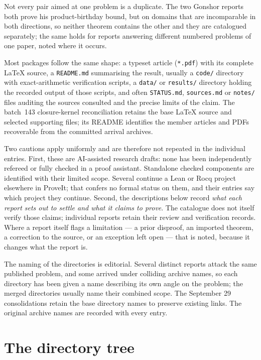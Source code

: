 \documentclass[11pt]{article}
\begin{document}
Not every pair aimed at one problem is a duplicate.  The two Gonshor
reports both prove his product-birthday bound, but on domains that are
incomparable in both directions, so neither theorem contains the other and they
are catalogued separately; the same holds for reports answering different numbered problems of
one paper, noted where it occurs.

Most packages follow the same shape: a typeset article
(\texttt{*.pdf}) with its complete \LaTeX{} source, a \texttt{README.md}
summarising the result, usually a \texttt{code/} directory with exact-arithmetic
verification scripts, a \texttt{data/} or \texttt{results/} directory holding the
recorded output of those scripts, and often \texttt{STATUS.md},
\texttt{sources.md} or \texttt{notes/} files auditing the sources consulted and
the precise limits of the claim. The batch~143 closure-kernel reconciliation
retains the base \LaTeX{} source and selected supporting files; its README
identifies the member articles and PDFs recoverable from the committed
arrival archives.

Two cautions apply uniformly and are therefore not repeated in the individual
entries. First, these are AI-assisted research drafts: none has been
independently refereed or fully checked in a proof assistant. Standalone
checked components are identified with their limited scope.
Several continue a Lean or Rocq project elsewhere in ProveIt; that confers no
formal status on them, and their entries say which project they continue.  Second,
the descriptions below record \emph{what each report sets out to settle and what
it claims to prove}. The catalogue does not itself verify those claims;
individual reports retain their review and verification records.
Where a report itself flags a limitation --- a prior disproof, an imported
theorem, a correction to the source, or an exception left open --- that is noted,
because it changes what the report is.

The naming of the directories is editorial.  Several distinct reports attack the
same published problem, and some arrived under colliding archive names, so each
directory has been given a name describing its own angle on the problem; the
merged directories usually name their combined scope. The September 29
consolidations retain the base directory names to preserve existing links.  The
original archive names are recorded with every entry.

\clearpage
\section{The directory tree}
\label{sec:tree}
\end{document}
